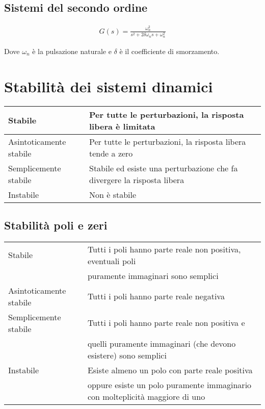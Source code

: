 \documentclass{article}
\begin{document}
\subsection{Sistemi del secondo ordine}

  \begin{align}
    G(s) = \frac{\omega_n^2}{s^2 + 2 \delta \omega_n s + \omega_n^2}
  \end{align}

  Dove $\omega_n$ \`e la pulsazione naturale e $\delta$ \`e il coefficiente di smorzamento.


  \section{Stabilit\`a dei sistemi dinamici}

  \begin{center}
    \begin{tabular}{| l | l |}
      \hline
      Stabile & Per tutte le perturbazioni, la risposta libera \`e limitata \\
      \hline
      Asintoticamente stabile & Per tutte le perturbazioni, la risposta libera tende a zero \\
      \hline
      Semplicemente stabile & Stabile ed esiste una perturbazione che fa divergere la risposta libera \\
      \hline 
      Instabile & Non \`e stabile \\
      \hline
    \end{tabular}
  \end{center}

  \subsection{Stabilit\`a poli e zeri}
  \begin{center}
    \begin{tabular}{| l | l |}
      \hline
        Stabile & Tutti i poli hanno parte reale non positiva, eventuali poli \\
        & puramente immaginari sono semplici \\

      \hline
        Asintoticamente stabile & Tutti i poli hanno parte reale negativa \\
      \hline
        Semplicemente stabile & Tutti i poli hanno parte reale non positiva e \\ 
        & quelli puramente immaginari (che devono esistere) sono semplici \\

      \hline
        Instabile & Esiste almeno un polo con parte reale positiva \\
        & oppure esiste un polo puramente immaginario con molteplicit\`a maggiore di uno \\

      \hline
    \end{tabular}
  \end{center}
\end{document}
